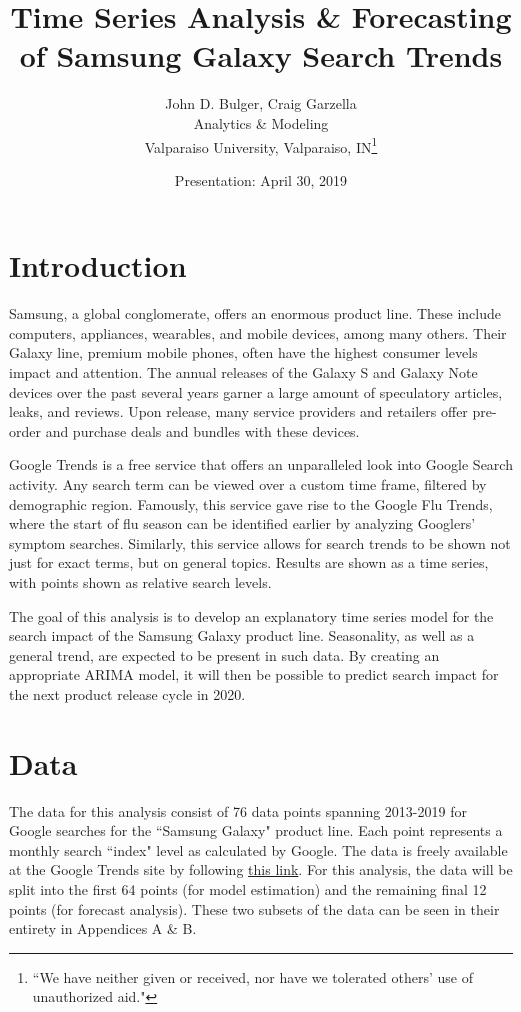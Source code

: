 \documentclass[12pt]{article}
\title{Time Series Analysis \& Forecasting of Samsung Galaxy Search Trends}
\author{John D. Bulger, Craig Garzella\\
	Analytics \& Modeling
	\\Valparaiso University, Valparaiso, IN\thanks{``We have neither given or received, nor have we tolerated others' use of unauthorized aid."}}
\date{Presentation: April 30, 2019}
\begin{document}
	\maketitle
	
	\section{Introduction}
	
	Samsung, a global conglomerate, offers an enormous product line.  These include computers, appliances, wearables, and mobile devices, among many others.  Their Galaxy line, premium mobile phones, often have the highest consumer levels impact and attention.  The annual releases of the Galaxy S and Galaxy Note devices over the past several years garner a large amount of speculatory articles, leaks, and reviews.  Upon release, many service providers and retailers offer pre-order and purchase deals and bundles with these devices.
	
	\par
	
	
	Google Trends is a free service that offers an unparalleled look into Google Search activity.  Any search term can be viewed over a custom time frame, filtered by demographic region.  Famously, this service gave rise to the Google Flu Trends, where the start of flu season can be identified earlier by analyzing Googlers' symptom searches.  Similarly, this service allows for search trends to be shown not just for exact terms, but on general topics.  Results are shown as a time series, with points shown as relative search levels.
	
	\par
	
	The goal of this analysis is to develop an explanatory time series model for the search impact of the Samsung Galaxy product line.  Seasonality, as well as a general trend, are expected to be present in such data.  By creating an appropriate ARIMA model, it will then be possible to predict search impact for the next product release cycle in 2020.
	
	\section{Data}
	
	The data for this analysis consist of 76 data points spanning 2013-2019 for Google searches for the ``Samsung Galaxy" product line.\cite{data}  Each point represents a monthly search ``index" level as calculated by Google.  The data is freely available at the Google Trends site by following \href{https://trends.google.com/trends/explore?q=\%2Fm\%2F0hnbsn3\&geo=US}{this link}.  For this analysis, the data will be split into the first 64 points (for model estimation) and the remaining final 12 points (for forecast analysis).  These two subsets of the data can be seen in their entirety in Appendices A \& B.
	
\end{document}
